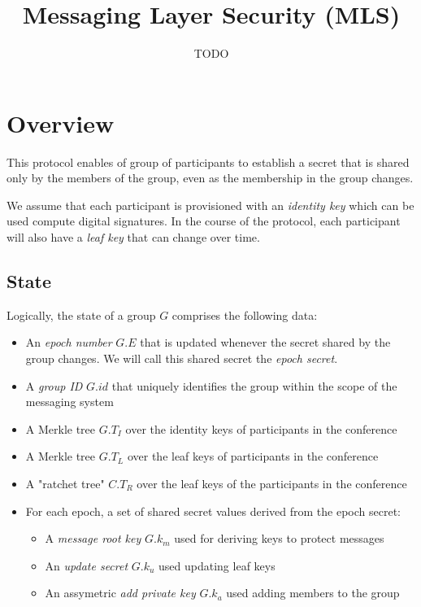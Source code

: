 \documentclass[11pt, oneside]{article}
\title{Messaging Layer Security (MLS)}
\author{TODO}
\begin{document}
\maketitle

\section{Overview}

This protocol enables of group of participants to establish a secret that is shared only by the members of the group, even as the membership in the group changes.  

We assume that each participant is provisioned with an \textit{identity key} which can be used compute digital signatures.  In the course of the protocol, each participant will also have a \textit{leaf key} that can change over time.


\subsection{State}

Logically, the state of a group $G$ comprises the following data:

\begin{itemize}
\item{An \textit{epoch number} $G.E$ that is updated whenever the secret shared by the group changes.  We will call this shared secret the \textit{epoch secret}.}
\item{A \textit{group ID} $G.id$ that uniquely identifies the group within the scope of the messaging system}
\item{A Merkle tree $G.T_I$ over the identity keys of participants in the conference}
\item{A Merkle tree $G.T_L$ over the leaf keys of participants in the conference}
\item{A "ratchet tree" $C.T_R$ over the leaf keys of the participants in the conference}
\item{For each epoch, a set of shared secret values derived from the epoch secret:
	\begin{itemize}
	\item{A \textit{message root key} $G.k_m$ used for deriving keys to protect messages}
	\item{An \textit{update secret}  $G.k_u$ used updating leaf keys}
	\item{An assymetric \textit{add private key} $G.k_a$ used adding members to the group}
	\end{itemize}
}
\end{itemize}
\end{document}
